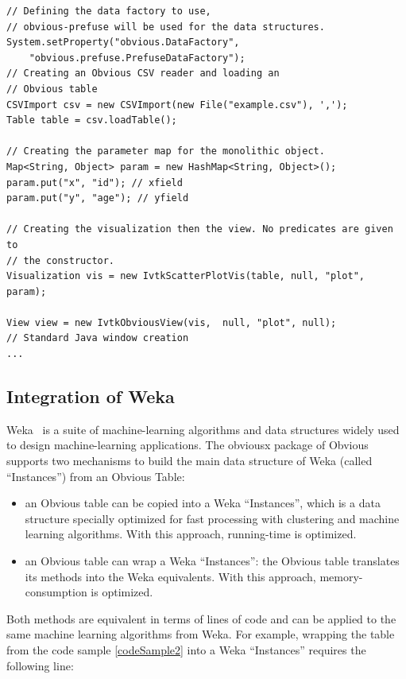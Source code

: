 \begin{lstlisting}[caption={Combining different Obvious implementations to display a scatter-plot},label=codeSample2]
// Defining the data factory to use,
// obvious-prefuse will be used for the data structures.
System.setProperty("obvious.DataFactory",
    "obvious.prefuse.PrefuseDataFactory");
// Creating an Obvious CSV reader and loading an
// Obvious table
CSVImport csv = new CSVImport(new File("example.csv"), ',');
Table table = csv.loadTable();

// Creating the parameter map for the monolithic object.
Map<String, Object> param = new HashMap<String, Object>();
param.put("x", "id"); // xfield
param.put("y", "age"); // yfield

// Creating the visualization then the view. No predicates are given to
// the constructor.
Visualization vis = new IvtkScatterPlotVis(table, null, "plot", param);

View view = new IvtkObviousView(vis,  null, "plot", null);
// Standard Java window creation
...
\end{lstlisting}

\subsection{Integration of Weka}

Weka~\cite{Weka} is a suite of machine-learning algorithms and data
structures widely used to design machine-learning applications.  
The obviousx package of Obvious supports two mechanisms to build the
main data structure of Weka (called ``Instances'') from an Obvious
Table:

\begin{itemize}
\item an Obvious table can be copied into a Weka ``Instances'', which
  is a data structure specially optimized for fast processing with
  clustering and machine learning algorithms.  With this approach,
  running-time is optimized.
\item an Obvious table can wrap a Weka ``Instances'': the Obvious
  table translates its methods into the Weka equivalents.  With this
  approach, memory-consumption is optimized.
\end{itemize}

Both methods are equivalent in terms of lines of code and can be
applied to the same machine learning algorithms from Weka.  For
example, wrapping the table from the code sample \ref{codeSample2}
into a Weka ``Instances''  requires the following line:

